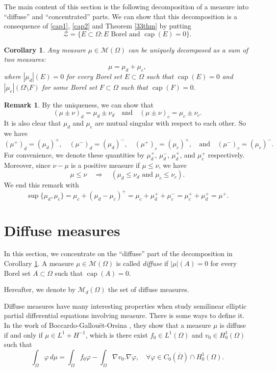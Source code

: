 \documentclass[a4paper, 11pt]{report}
\newtheorem{crr}{Corollary}[chapter]
\theoremstyle{definition}\newtheorem*{rmk}{Remark}
\DeclareMathOperator{\capa}{cap}
\begin{document}
The main content of this section is the following decomposition of a measure into ``diffuse'' and ``concentrated'' parts. We can show that this decomposition is a consequence of \eqref{cap1}, \eqref{cap2} and Theorem \ref{33thm} by putting
\[
\mathcal{Z} = \{E \subset \Omega:  E\text{ Borel and } \capa(E) = 0\}.
\]


\begin{crr}\label{331crr}
Any measure $\mu \in \mathcal{M}(\Omega)$ can be uniquely decomposed as a sum of two measures:
\[
\mu = \mu_d + \mu_c,
\]
where $|\mu_d|(E)=0$ for every Borel set $E \subset \Omega$ such that $\capa (E) = 0$ and $|\mu_c|(\Omega \setminus F)$ for some Borel set $F \subset \Omega$ such that $\capa (F) = 0$.
\end{crr}

\begin{rmk}
By the uniqueness, we can show that
\[
(\mu \pm \nu)_d = \mu_d \pm \nu_d \quad \text{and} \quad (\mu \pm \nu)_c = \mu_c \pm \nu_c.
\]
It is also clear that $\mu_d$ and $\mu_c$ are mutual singular with respect to each other. So we have
\[
(\mu^+)_d = (\mu_d)^+, \quad (\mu^-)_d = (\mu_d)^-,\quad (\mu^+)_c = (\mu_c)^+, \quad\text{and} \quad (\mu^-)_c = (\mu_c)^-.
\]
For convenience, we denote these quantities by $\mu^+_d$, $\mu^-_d$, $\mu^+_d$, and $\mu^+_c$ respectively. Moreover, since $\nu - \mu$ is a positive measure if $\mu \le \nu$, we have
\[
\mu \le \nu \quad\Rightarrow\quad (\mu_d \le \nu_d \text{ and } \mu_c \le \nu_c).
\]
We end this remark with
\[
\sup\{\mu_d, \mu_c\} = \mu_c + (\mu_d - \mu_c)^+ = \mu_c + \mu_d^+ + \mu_c^- = \mu_c^+ + \mu_d^+ = \mu^+.
\]
\end{rmk}

\section{Diffuse measures}
\mbox{}

In this section, we concentrate on the ``diffuse'' part of the decomposition in Corollary \ref{331crr}. A measure $\mu \in \mathcal{M}(\Omega)$ is called \emph{diffuse} if $|\mu|(A) = 0$ for every Borel set $A \subset \Omega$ such that $\capa(A) =0$.

Hereafter, we denote by $\mathcal{M}_d(\Omega)$ the set of diffuse measures.

Diffuse measures have many interesting properties when study semilinear elliptic partial differential equations involving measure. There is some ways to define it. In the work of Boccardo-Gallou\"et-Orsina \cite{BGO}, they show that a measure $\mu$ is diffuse if and only if $\mu\in L^1 + H^{-1}$, which is there exist $f_0 \in L^1(\Omega)$ and $v_0 \in H^1_0(\Omega)$ such that
\[
\int_{\Omega}\varphi \,d\mu = \int_{\Omega} f_0\varphi - \int_{\Omega}\nabla v_0 .\nabla \varphi, \quad\forall \varphi \in C_0(\overline{\Omega})\cap H^1_0(\Omega).
\]
\end{document}
